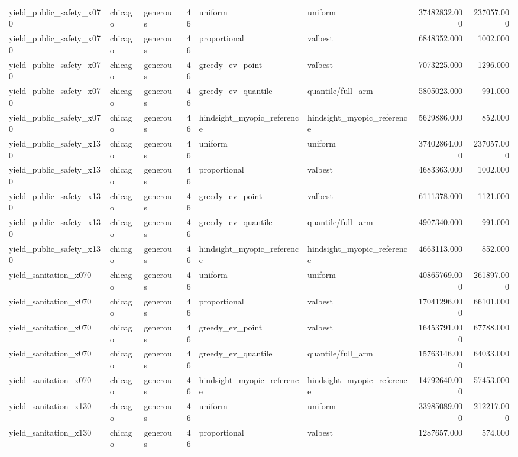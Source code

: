 \begin{tabular}{lllrllrr}
yield\_public\_safety\_x070 & chicago & generous & 46 & uniform & uniform & 37482832.000 & 237057.000 \\
yield\_public\_safety\_x070 & chicago & generous & 46 & proportional & valbest & 6848352.000 & 1002.000 \\
yield\_public\_safety\_x070 & chicago & generous & 46 & greedy\_ev\_point & valbest & 7073225.000 & 1296.000 \\
yield\_public\_safety\_x070 & chicago & generous & 46 & greedy\_ev\_quantile & quantile/full\_arm & 5805023.000 & 991.000 \\
yield\_public\_safety\_x070 & chicago & generous & 46 & hindsight\_myopic\_reference & hindsight\_myopic\_reference & 5629886.000 & 852.000 \\
yield\_public\_safety\_x130 & chicago & generous & 46 & uniform & uniform & 37402864.000 & 237057.000 \\
yield\_public\_safety\_x130 & chicago & generous & 46 & proportional & valbest & 4683363.000 & 1002.000 \\
yield\_public\_safety\_x130 & chicago & generous & 46 & greedy\_ev\_point & valbest & 6111378.000 & 1121.000 \\
yield\_public\_safety\_x130 & chicago & generous & 46 & greedy\_ev\_quantile & quantile/full\_arm & 4907340.000 & 991.000 \\
yield\_public\_safety\_x130 & chicago & generous & 46 & hindsight\_myopic\_reference & hindsight\_myopic\_reference & 4663113.000 & 852.000 \\
yield\_sanitation\_x070 & chicago & generous & 46 & uniform & uniform & 40865769.000 & 261897.000 \\
yield\_sanitation\_x070 & chicago & generous & 46 & proportional & valbest & 17041296.000 & 66101.000 \\
yield\_sanitation\_x070 & chicago & generous & 46 & greedy\_ev\_point & valbest & 16453791.000 & 67788.000 \\
yield\_sanitation\_x070 & chicago & generous & 46 & greedy\_ev\_quantile & quantile/full\_arm & 15763146.000 & 64033.000 \\
yield\_sanitation\_x070 & chicago & generous & 46 & hindsight\_myopic\_reference & hindsight\_myopic\_reference & 14792640.000 & 57453.000 \\
yield\_sanitation\_x130 & chicago & generous & 46 & uniform & uniform & 33985089.000 & 212217.000 \\
yield\_sanitation\_x130 & chicago & generous & 46 & proportional & valbest & 1287657.000 & 574.000 \\

\end{tabular}
